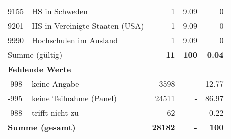 \begin{longtable}{lXrrr}
     9155 &
     \multicolumn{1}{X}{ HS in Schweden   } &


       \num{1} &
       \num[round-mode=places,round-precision=2]{9,09} &
         \num[round-mode=places,round-precision=2]{0} \\

     9201 &
     \multicolumn{1}{X}{ HS in Vereinigte Staaten (USA)   } &


       \num{1} &
       \num[round-mode=places,round-precision=2]{9,09} &
         \num[round-mode=places,round-precision=2]{0} \\

     9990 &
     \multicolumn{1}{X}{ Hochschulen im Ausland   } &


       \num{1} &
       \num[round-mode=places,round-precision=2]{9,09} &
         \num[round-mode=places,round-precision=2]{0} \\
     \midrule
     \multicolumn{2}{l}{Summe (gültig)} &
       \textbf{\num{11}} &
     \textbf{100} &
       \textbf{\num[round-mode=places,round-precision=2]{0,04}} \\
     \multicolumn{5}{l}{\textbf{Fehlende Werte}}\\
       -998 &
       keine Angabe &
         \num{3598} &
        - &
         \num[round-mode=places,round-precision=2]{12,77} \\
       -995 &
       keine Teilnahme (Panel) &
         \num{24511} &
        - &
         \num[round-mode=places,round-precision=2]{86,97} \\
       -988 &
       trifft nicht zu &
         \num{62} &
        - &
         \num[round-mode=places,round-precision=2]{0,22} \\
     \midrule
     \multicolumn{2}{l}{\textbf{Summe (gesamt)}} &
          \textbf{\num{28182}} &
        \textbf{-} &
        \textbf{100} \\
     \bottomrule
     \end{longtable}
     
